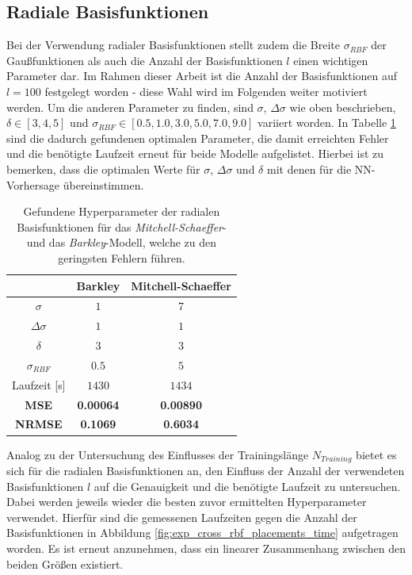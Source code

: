 \subsection{Radiale Basisfunktionen}
Bei der Verwendung radialer Basisfunktionen stellt zudem die Breite $\sigma_{RBF}$ der Gaußfunktionen als auch die Anzahl der Basisfunktionen $l$ einen wichtigen Parameter dar. Im Rahmen dieser Arbeit ist die Anzahl der Basisfunktionen auf $l=100$ festgelegt worden - diese Wahl wird im Folgenden weiter motiviert werden. Um die anderen Parameter zu finden, sind $\sigma$, $\Delta \sigma$ wie oben beschrieben, $\delta \in [3,4,5]$ und $\sigma_{RBF} \in [0.5, 1.0, 3.0, 5.0, 7.0, 9.0]$ variiert worden. In Tabelle \ref{tab:exp_cross_rbf_results} sind die dadurch gefundenen optimalen Parameter, die damit erreichten Fehler und die benötigte Laufzeit erneut für beide Modelle aufgelistet. Hierbei ist zu bemerken, dass die optimalen Werte für $\sigma$, $\Delta \sigma$ und $\delta$ mit denen für die NN-Vorhersage übereinstimmen. 

\begin{table}[h]
	\centering

	\begin{tabular}{|c|c|c|}
		\multicolumn{1}{c|}{} & Barkley & Mitchell-Schaeffer \\ 
		\hline \hline 
		\rule[-1ex]{0pt}{2.5ex} $\sigma$ & $1$ & $7$ \\ 
		\hline 
		\rule[-1ex]{0pt}{2.5ex} $\Delta \sigma$ & $1$ & $1$ \\ 
		\hline 
		\rule[-1ex]{0pt}{2.5ex} $\delta$ & $3$ & $3$ \\ 
		\hline 
		\rule[-1ex]{0pt}{2.5ex} $\sigma_{RBF}$ & $0.5$ & $5$ \\ 
		\hline 
		\rule[-1ex]{0pt}{2.5ex} Laufzeit [s] & $1430$ & $1434$ \\ 
		\hline 
		\rule[-1ex]{0pt}{2.5ex} \textbf{MSE} & \textbf{0.00064} & \textbf{0.00890} \\ 
		\hline 
		\rule[-1ex]{0pt}{2.5ex} \textbf{NRMSE} & \textbf{0.1069} & \textbf{0.6034} \\ 
		\hline 
	\end{tabular} 
	\caption{Gefundene Hyperparameter der radialen Basisfunktionen für das \textit{Mitchell-Schaeffer}- und das \textit{Barkley}-Modell, welche zu den geringsten Fehlern führen.}
	\label{tab:exp_cross_rbf_results}
\end{table} 

Analog zu der Untersuchung des Einflusses der Trainingslänge $N_{Training}$ bietet es sich für die radialen Basisfunktionen an, den Einfluss der Anzahl der verwendeten Basisfunktionen $l$ auf die Genauigkeit und die benötigte Laufzeit zu untersuchen. Dabei werden jeweils wieder die besten zuvor ermittelten Hyperparameter verwendet. Hierfür sind die gemessenen Laufzeiten gegen die Anzahl der Basisfunktionen in Abbildung \ref{fig:exp_cross_rbf_placements_time} aufgetragen worden. Es ist erneut anzunehmen, dass ein linearer Zusammenhang zwischen den beiden Größen existiert.

